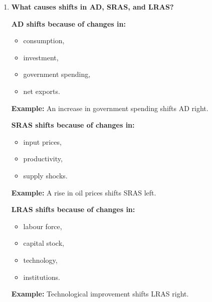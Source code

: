 \documentclass[12pt]{article}
\begin{document}
\begin{enumerate}[label=\textbf{\arabic*.}, start=12]
So:
\[
\boxed{\text{SRAS reflects short-run price-output responses, while LRAS reflects potential output}}
\]

\vspace{0.5em}

\item \textbf{What causes shifts in AD, SRAS, and LRAS?}

\textbf{AD shifts because of changes in:}
\begin{itemize}
    \item consumption,
    \item investment,
    \item government spending,
    \item net exports.
\end{itemize}

\textbf{Example:} An increase in government spending shifts AD right.

\textbf{SRAS shifts because of changes in:}
\begin{itemize}
    \item input prices,
    \item productivity,
    \item supply shocks.
\end{itemize}

\textbf{Example:} A rise in oil prices shifts SRAS left.

\textbf{LRAS shifts because of changes in:}
\begin{itemize}
    \item labour force,
    \item capital stock,
    \item technology,
    \item institutions.
\end{itemize}

\textbf{Example:} Technological improvement shifts LRAS right.

\end{enumerate}
\end{document}
